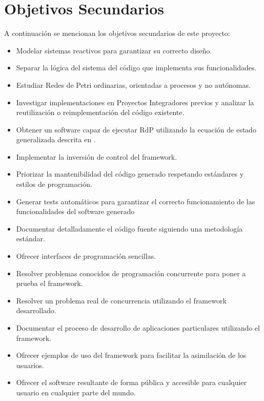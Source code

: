 \section{Objetivos Secundarios}
\label{sec:objetivos_secundarios}
A continuación se mencionan los objetivos secundarios de este proyecto:
\begin{itemize}
  \item Modelar sistemas reactivos para garantizar su correcto diseño.
  \item Separar la lógica del sistema del código que implementa sus
  funcionalidades.
  \item Estudiar Redes de Petri ordinarias, orientadas a procesos y no
  autónomas.
  \item Investigar implementaciones en Proyectos Integradores previos y analizar
  la reutilización o reimplementación del código existente.
  \item Obtener un software capaz de ejecutar RdP utilizando la ecuación de
  estado generalizada descrita en \cite{Ecuacion_generalizada_LAC}.
  \item Implementar la inversión de control del framework.
  \item Priorizar la mantenibilidad del código generado respetando estándares y
  estilos de programación.
  \item Generar tests automáticos para garantizar el correcto funcionamiento de
  las funcionalidades del software generado
  \item Documentar detalladamente el código fuente siguiendo una metodología
  estándar.
  \item Ofrecer interfaces de programación sencillas.
  \item Resolver problemas conocidos de programación concurrente para poner a
  prueba el framework.
  \item Resolver un problema real de concurrencia utilizando el framework
  desarrollado.
  \item Documentar el proceso de desarrollo de aplicaciones particulares
  utilizando el framework.
  \item Ofrecer ejemplos de uso del framework para facilitar la asimilación de
  los usuarios.
  \item Ofrecer el software resultante de forma pública y accesible para
  cualquier usuario en cualquier parte del mundo.
\end{itemize}